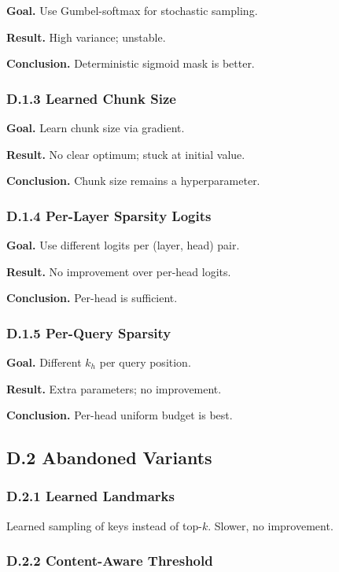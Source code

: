 \textbf{Goal.} Use Gumbel-softmax for stochastic sampling.

\textbf{Result.} High variance; unstable.

\textbf{Conclusion.} Deterministic sigmoid mask is better.

\subsubsection{D.1.3 Learned Chunk Size}

\textbf{Goal.} Learn chunk size via gradient.

\textbf{Result.} No clear optimum; stuck at initial value.

\textbf{Conclusion.} Chunk size remains a hyperparameter.

\subsubsection{D.1.4 Per-Layer Sparsity Logits}

\textbf{Goal.} Use different logits per (layer, head) pair.

\textbf{Result.} No improvement over per-head logits.

\textbf{Conclusion.} Per-head is sufficient.

\subsubsection{D.1.5 Per-Query Sparsity}

\textbf{Goal.} Different $k_h$ per query position.

\textbf{Result.} Extra parameters; no improvement.

\textbf{Conclusion.} Per-head uniform budget is best.

\subsection{D.2 Abandoned Variants}

\subsubsection{D.2.1 Learned Landmarks}

Learned sampling of keys instead of top-$k$. Slower, no improvement.

\subsubsection{D.2.2 Content-Aware Threshold}

